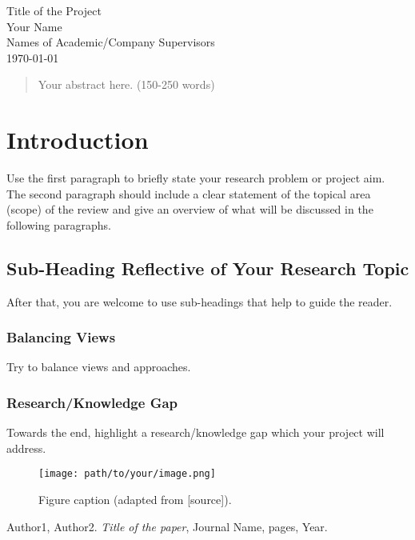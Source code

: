 \documentclass[12pt]{article}
\begin{document}
\begin{titlepage}
    \centering
    \vspace*{60px}
    \huge{Title of the Project}\\
    \vspace{10px}
    \large{Your Name}\\
    \large{Names of Academic/Company Supervisors}\\
    \vfill
    \today
    \vfill
\end{titlepage}

\newpage
\begin{abstract}
\noindent
Your abstract here. (150-250 words)
\end{abstract}

\newpage
\section*{Introduction}
Use the first paragraph to briefly state your research problem or project aim.\\

\noindent
The second paragraph should include a clear statement of the topical area (scope) of the review and give an overview of what will be discussed in the following paragraphs.

\subsection*{Sub-Heading Reflective of Your Research Topic}
After that, you are welcome to use sub-headings that help to guide the reader.

\subsubsection*{Balancing Views}
Try to balance views and approaches.

\subsubsection*{Research/Knowledge Gap}
Towards the end, highlight a research/knowledge gap which your project will address.

\begin{figure}[ht]
\centering
\texttt{[image: path/to/your/image.png]}
\caption{Figure caption (adapted from [source]).}
\label{fig:my_label}
\end{figure}

\newpage
\begin{thebibliography}{20}
    Author1, Author2. 
    \newblock \emph{Title of the paper},
    \newblock Journal Name, pages, Year.
    
\end{thebibliography}
\end{document}
